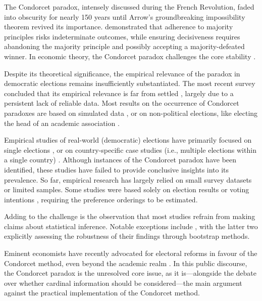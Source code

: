 \documentclass[12pt]{scrartcl}
\begin{document}
The Condorcet paradox, intensely discussed during the French Revolution, faded into obscurity for nearly 150 years \citep[][p.~99]{Rothschild2005, McLean2019} until Arrow’s groundbreaking impossibility theorem revived its importance.  \citet{Arrow1950} demonstrated that adherence to majority principles risks indeterminate outcomes, while ensuring decisiveness requires abandoning the majority principle and possibly accepting a majority-defeated winner. In economic theory, the Condorcet paradox challenges the core stability \citep{Moulin2014}.

Despite its theoretical significance, the empirical relevance of the paradox in democratic elections remains insufficiently substantiated. The most recent survey concluded that its empirical relevance is far from settled \citep{VanDeemen2013}, largely due to a persistent lack of reliable data. Most results on the occurrence of Condorcet paradoxes are based on simulated data \citep{Lepelley2001, Gehrlein2006, Sauermann2022}, or on non-political elections, like electing the head of an academic association \citep{Chamberlin1984, Feld1992, Regenwetter2007, Tideman2009, Popov2014}.

Empirical studies of real-world (democratic) elections have primarily focused on single elections \citep{Kurrild2018, Darmann2019, Potthoff2021}, or on country-specific case studies (i.e., multiple elections within a single country) \citep{Abramson1995, vanDeemen1998, KurrildKlitgaard2001, KurrildKlitgaard2008}. Although instances of the Condorcet paradox have been identified, these studies have failed to provide conclusive insights into its prevalence. So far, empirical research has largely relied on small survey datasets or limited samples. Some studies were based solely on election results \citep[e.g.,][]{Riker1988} or voting intentions \citep[e.g.,][]{McDonald2012}, requiring the preference orderings to be estimated.

Adding to the challenge is the observation that most studies refrain from making claims about statistical inference. Notable exceptions include \cite{Desai2025, Regenwetter2007, Darmann2019}, with the latter two explicitly assessing the robustness of their findings through bootstrap methods.

Eminent economists have recently advocated for electoral reforms in favour of the Condorcet method, even beyond the academic realm \citep{Maskin2016, Maskin2017, Maskin2017a}. In this public discourse, the Condorcet paradox is the unresolved core issue, as it is—alongside the debate over whether cardinal information should be considered—the main argument against the practical implementation of the Condorcet method.
\end{document}
